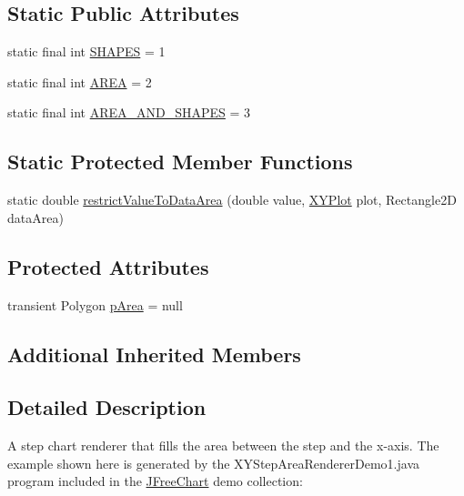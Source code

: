 \subsection*{Static Public Attributes}
\begin{DoxyCompactItemize}
\item 
static final int \mbox{\hyperlink{classorg_1_1jfree_1_1chart_1_1renderer_1_1xy_1_1_x_y_step_area_renderer_aa5f77924da59c04ad3622239b18fad00}{S\+H\+A\+P\+ES}} = 1
\item 
static final int \mbox{\hyperlink{classorg_1_1jfree_1_1chart_1_1renderer_1_1xy_1_1_x_y_step_area_renderer_a1a1032772048695508d497d92ebe87f4}{A\+R\+EA}} = 2
\item 
static final int \mbox{\hyperlink{classorg_1_1jfree_1_1chart_1_1renderer_1_1xy_1_1_x_y_step_area_renderer_a2966033c6876fbebf25e929331fa8376}{A\+R\+E\+A\+\_\+\+A\+N\+D\+\_\+\+S\+H\+A\+P\+ES}} = 3
\end{DoxyCompactItemize}
\subsection*{Static Protected Member Functions}
\begin{DoxyCompactItemize}
\item 
static double \mbox{\hyperlink{classorg_1_1jfree_1_1chart_1_1renderer_1_1xy_1_1_x_y_step_area_renderer_acaa718b73a7ee9ce33644aa90c19fe70}{restrict\+Value\+To\+Data\+Area}} (double value, \mbox{\hyperlink{classorg_1_1jfree_1_1chart_1_1plot_1_1_x_y_plot}{X\+Y\+Plot}} plot, Rectangle2D data\+Area)
\end{DoxyCompactItemize}
\subsection*{Protected Attributes}
\begin{DoxyCompactItemize}
\item 
transient Polygon \mbox{\hyperlink{classorg_1_1jfree_1_1chart_1_1renderer_1_1xy_1_1_x_y_step_area_renderer_ab4e8e43e96cbcfdc03d6dcc8036c463b}{p\+Area}} = null
\end{DoxyCompactItemize}
\subsection*{Additional Inherited Members}


\subsection{Detailed Description}
A step chart renderer that fills the area between the step and the x-\/axis. The example shown here is generated by the {\ttfamily X\+Y\+Step\+Area\+Renderer\+Demo1.\+java} program included in the \mbox{\hyperlink{classorg_1_1jfree_1_1chart_1_1_j_free_chart}{J\+Free\+Chart}} demo collection\+: ~\newline
~\newline
  

